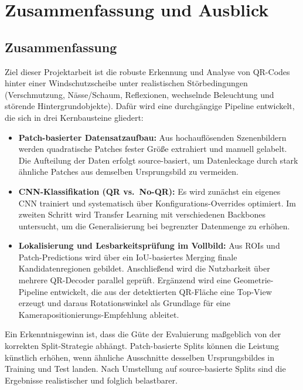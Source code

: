 \chapter{Zusammenfassung und Ausblick}
\label{ch:outlook}

\section{Zusammenfassung}
Ziel dieser Projektarbeit ist die robuste Erkennung und Analyse von \ac{QR}-Codes hinter einer Windschutzscheibe unter realistischen Störbedingungen (Verschmutzung, Nässe/Schaum, Reflexionen, wechselnde Beleuchtung und störende Hintergrundobjekte). Dafür wird eine durchgängige Pipeline entwickelt, die sich in drei Kernbausteine gliedert:

\begin{itemize}
    \item \textbf{Patch-basierter Datensatzaufbau:} Aus hochauflösenden Szenenbildern werden quadratische Patches fester Größe extrahiert und manuell gelabelt. Die Aufteilung der Daten erfolgt source-basiert, um Datenleckage durch stark ähnliche Patches aus demselben Ursprungsbild zu vermeiden.
    \item \textbf{\ac{CNN}-Klassifikation (\ac{QR} vs.\ No-\ac{QR}):} Es wird zunächst ein eigenes \ac{CNN} trainiert und systematisch über Konfigurations-Overrides optimiert. Im zweiten Schritt wird Transfer Learning mit verschiedenen Backbones untersucht, um die Generalisierung bei begrenzter Datenmenge zu erhöhen.
    \item \textbf{Lokalisierung und Lesbarkeitsprüfung im Vollbild:} Aus \acp{ROI} und Patch-Predictions wird über ein \ac{IoU}-basiertes Merging finale Kandidatenregionen gebildet. Anschließend wird die Nutzbarkeit über mehrere \ac{QR}-Decoder parallel geprüft. Ergänzend wird eine Geometrie-Pipeline entwickelt, die aus der detektierten \ac{QR}-Fläche eine Top-View erzeugt und daraus Rotationswinkel als Grundlage für eine Kamerapositionierungs-Empfehlung ableitet.
\end{itemize}

Ein Erkenntnisgewinn ist, dass die Güte der Evaluierung maßgeblich von der korrekten Split-Strategie abhängt. Patch-basierte Splits können die Leistung künstlich erhöhen, wenn ähnliche Ausschnitte desselben Ursprungsbildes in Training und Test landen. Nach Umstellung auf source-basierte Splits sind die Ergebnisse realistischer und folglich belastbarer.

\newpage

